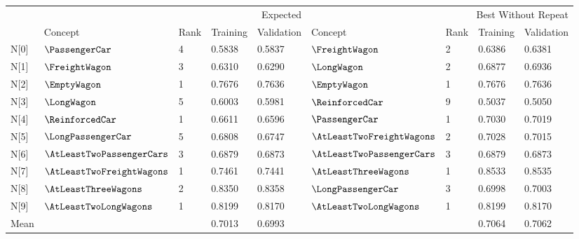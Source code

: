 \begin{tabular}{lllllllll}
\toprule
 & \multicolumn{4}{r}{Expected} & \multicolumn{4}{r}{Best Without Repeat} \\
 & Concept & Rank & Training & Validation & Concept & Rank & Training & Validation \\
\midrule
N[0] & $\PassengerCar$ & 4 & 0.5838 & 0.5837 & $\FreightWagon$ & 2 & 0.6386 & 0.6381 \\
N[1] & $\FreightWagon$ & 3 & 0.6310 & 0.6290 & $\LongWagon$ & 2 & 0.6877 & 0.6936 \\
N[2] & $\EmptyWagon$ & 1 & 0.7676 & 0.7636 & $\EmptyWagon$ & 1 & 0.7676 & 0.7636 \\
N[3] & $\LongWagon$ & 5 & 0.6003 & 0.5981 & $\ReinforcedCar$ & 9 & 0.5037 & 0.5050 \\
N[4] & $\ReinforcedCar$ & 1 & 0.6611 & 0.6596 & $\PassengerCar$ & 1 & 0.7030 & 0.7019 \\
N[5] & $\LongPassengerCar$ & 5 & 0.6808 & 0.6747 & $\AtLeastTwoFreightWagons$ & 2 & 0.7028 & 0.7015 \\
N[6] & $\AtLeastTwoPassengerCars$ & 3 & 0.6879 & 0.6873 & $\AtLeastTwoPassengerCars$ & 3 & 0.6879 & 0.6873 \\
N[7] & $\AtLeastTwoFreightWagons$ & 1 & 0.7461 & 0.7441 & $\AtLeastThreeWagons$ & 1 & 0.8533 & 0.8535 \\
N[8] & $\AtLeastThreeWagons$ & 2 & 0.8350 & 0.8358 & $\LongPassengerCar$ & 3 & 0.6998 & 0.7003 \\
N[9] & $\AtLeastTwoLongWagons$ & 1 & 0.8199 & 0.8170 & $\AtLeastTwoLongWagons$ & 1 & 0.8199 & 0.8170 \\
Mean &  &  & 0.7013 & 0.6993 &  &  & 0.7064 & 0.7062 \\
\bottomrule
\end{tabular}

